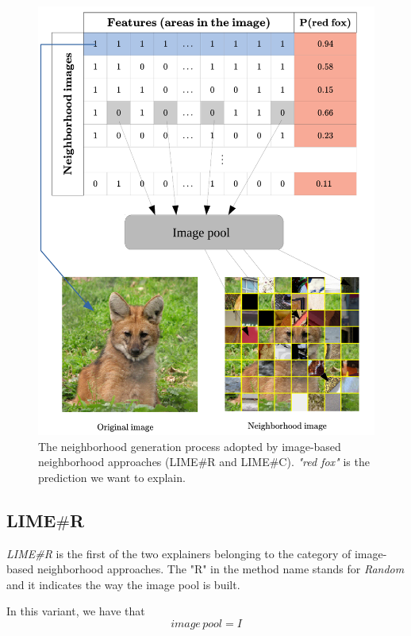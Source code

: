 \documentclass[12pt, twoside, a4paper]{report}
\begin{document}
\begin{figure}
\includegraphics[width=\textwidth]{images/image-based_neigh.png} 
\caption{The neighborhood generation process adopted by image-based neighborhood approaches (LIME\#R and LIME\#C). \textit{"red fox"} is the prediction we want to explain.}
\label{fig:img-based_neigh}
\end{figure}

\subsection{LIME$\#$R}

\textit{LIME\#R} is the first of the two explainers belonging to the category of image-based neighborhood approaches. The "R" in the method name stands for \textit{Random} and it indicates the way the image pool is built.

In this variant, we have that 
\begin{equation}
image\,pool = I
\label{eqn:image_pool}
\end{equation}
\end{document}
